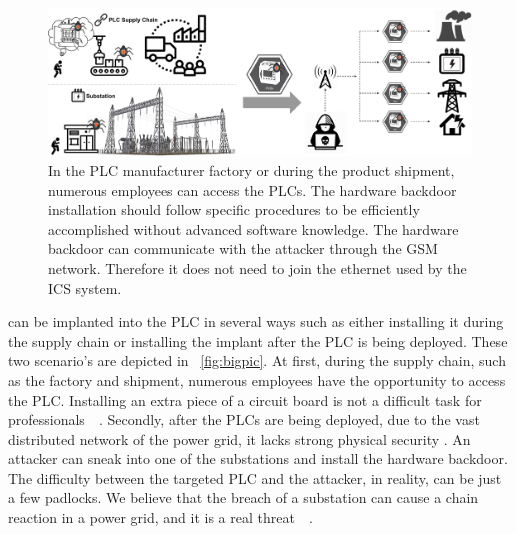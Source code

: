 \begin{figure}[tp!]
	\includegraphics[width=\textwidth]{figures/bigpic}
	\centering
	\caption{In the PLC manufacturer factory or during the product shipment, numerous employees can access the PLCs. The hardware backdoor installation should follow specific procedures to be efficiently accomplished without advanced software knowledge. The hardware backdoor can communicate with the attacker through the GSM network. Therefore it does not need to join the ethernet used by the ICS system.}
	\label{fig:bigpic}
\end{figure}

\name can be implanted into the PLC in several ways such as either installing it during the supply chain or installing the implant after the PLC is being deployed. These two scenario's are depicted in ~\autoref{fig:bigpic}. At first, during the supply chain, such as the factory and shipment, numerous employees have the opportunity to access the PLC. Installing an extra piece of a circuit board is not a difficult task for professionals~\cite{harrison2021malicious}~\cite{ o2015special}. Secondly, after the PLCs are being deployed, due to the vast distributed network of the power grid, it lacks strong physical security \cite{Loopholes2020}. An attacker can sneak into one of the substations and install the hardware backdoor. The difficulty between the targeted PLC and the attacker, in reality, can be just a few padlocks. We believe that the breach of a substation can cause a chain reaction in a power grid, and it is a real threat~\cite{substationattack}~\cite{chen2020study}.





